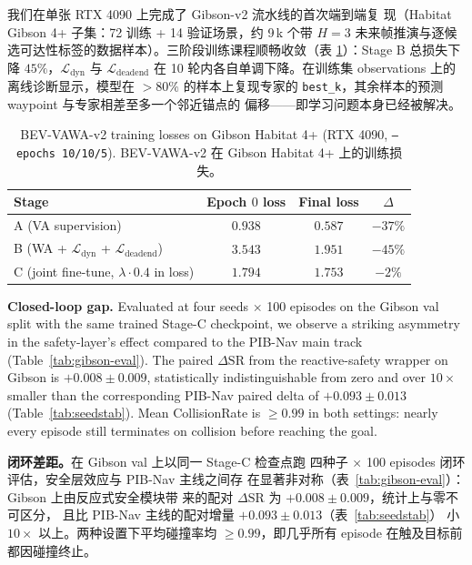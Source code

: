 \documentclass[11pt,a4paper]{article}
\newcommand{\en}[1]{\par\noindent #1\par\vspace{0.15em}}
\newcommand{\zh}[1]{\par\noindent\color{zhcol}\hspace{0.5em}#1\par\color{black}\vspace{0.6em}}
\begin{document}
\zh{\textsf{我们在单张 RTX 4090 上完成了 Gibson-v2 流水线的首次端到端复
现（Habitat Gibson 4+ 子集：72 训练 + 14 验证场景，约 9\,k 个带 $H{=}3$
未来帧推演与逐候选可达性标签的数据样本）。三阶段训练课程顺畅收敛（表
\ref{tab:gibson-train}）：Stage B 总损失下降 $45\%$，$\mathcal{L}_{\mathrm{dyn}}$
与 $\mathcal{L}_{\mathrm{deadend}}$ 在 10 轮内各自单调下降。在训练集
observations 上的离线诊断显示，模型在 $>80\%$ 的样本上复现专家的
\texttt{best\_k}，其余样本的预测 waypoint 与专家相差至多一个邻近锚点的
偏移——即学习问题本身已经被解决。}}

\begin{table}[H]
\centering\small
\caption{BEV-VAWA-v2 training losses on Gibson Habitat 4+
(RTX 4090, \texttt{--epochs 10/10/5}).
\textsf{\small BEV-VAWA-v2 在 Gibson Habitat 4+ 上的训练损失。}}
\label{tab:gibson-train}
\begin{tabular}{lccc}
\toprule
Stage & Epoch $0$ loss & Final loss & $\Delta$ \\
\midrule
A (VA supervision)                               & $0.938$ & $0.587$ & $-37\%$ \\
B (WA + $\mathcal{L}_{\mathrm{dyn}}$ + $\mathcal{L}_{\mathrm{deadend}}$) & $3.543$ & $1.951$ & $-45\%$ \\
C (joint fine-tune, $\lambda\cdot0.4$ in loss)   & $1.794$ & $1.753$ & $-2\%$ \\
\bottomrule
\end{tabular}
\end{table}

\en{\textbf{Closed-loop gap.} Evaluated at four seeds $\times$ 100
episodes on the Gibson val split with the same trained Stage-C
checkpoint, we observe a striking asymmetry in the safety-layer's
effect compared to the PIB-Nav main track (Table~\ref{tab:gibson-eval}).
The paired $\Delta\mathrm{SR}$ from the reactive-safety wrapper on
Gibson is $+0.008 \pm 0.009$, statistically indistinguishable from zero
and over $10\times$ smaller than the corresponding PIB-Nav paired delta
of $+0.093 \pm 0.013$ (Table~\ref{tab:seedstab}). Mean CollisionRate is
$\ge 0.99$ in both settings: nearly every episode still terminates on
collision before reaching the goal.}

\zh{\textsf{\textbf{闭环差距。}在 Gibson val 上以同一 Stage-C 检查点跑
四种子 $\times$ 100 episodes 闭环评估，安全层效应与 PIB-Nav 主线之间存
在显著非对称（表~\ref{tab:gibson-eval}）：Gibson 上由反应式安全模块带
来的配对 $\Delta\mathrm{SR}$ 为 $+0.008 \pm 0.009$，统计上与零不可区分，
且比 PIB-Nav 主线的配对增量 $+0.093 \pm 0.013$（表~\ref{tab:seedstab}）
小 $10\times$ 以上。两种设置下平均碰撞率均 $\ge 0.99$，即几乎所有
episode 在触及目标前都因碰撞终止。}}
\end{document}
